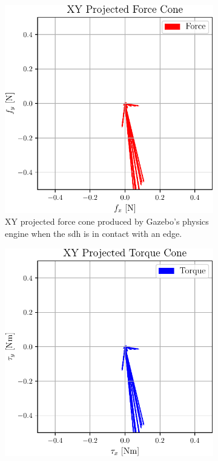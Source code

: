 \begin{figure}[!h]
	\centering
	\begin{subfigure}[b]{0.48\textwidth}
		\centering
		\includegraphics[width=\textwidth]{chapters/1-tactile-perception/fig/matplotlib/xy-projected-force-cones.pdf}
		\caption{XY projected force cone produced by Gazebo's physics engine when the \gls{sdh} is in contact with an edge.}
		\label{fig:xy-projected-force-cones}
	\end{subfigure}
	\hfill
	\begin{subfigure}[b]{0.48\textwidth}
		\centering
		\includegraphics[width=\textwidth]{chapters/1-tactile-perception/fig/matplotlib/xy-projected-torque-cones.pdf}

\end{subfigure}
\end{figure}
